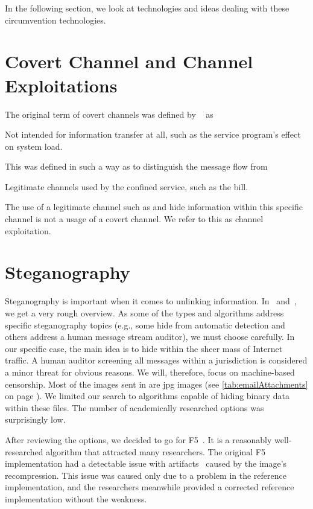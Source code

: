In the following section, we look at technologies and ideas dealing with these circumvention technologies.

\section{Covert Channel and Channel Exploitations}
The original term of covert channels was defined by \citeauthor{Lampson73anote}~\cite{Lampson73anote} as 

\begin{shadequote}{}
	Not intended for information transfer at all, such as the service program's effect on system load.
\end{shadequote}

This was defined  in such a way as to distinguish the message flow from 

\begin{shadequote}{}
	Legitimate channels used by the confined service, such as the bill.
\end{shadequote}

The use of a legitimate channel such as  and hide information within this specific channel is not a usage of a covert channel. We refer to this as channel exploitation.

\section{Steganography}
Steganography is important when it comes to unlinking information. In~\cite{6828087} and~\cite{subhedar2014current}, we get a very rough overview. As some of the types and algorithms address specific steganography topics (e.g., some hide from automatic detection and others address a human message stream auditor), we must choose carefully. In our specific case, the main idea is to hide within the sheer mass of Internet traffic. A human auditor screening all messages within a jurisdiction is considered a minor threat for obvious reasons. We will, therefore,  focus on machine-based censorship. Most of the images sent in  are jpg images (see \cref{tab:emailAttachments} on page \pageref{tab:emailAttachments}). We limited our search to algorithms capable of hiding binary data within these files. The number of academically researched options was surprisingly low.

After reviewing the options, we decided to go for F5~\cite{f5}. It is a reasonably well-researched algorithm that attracted many researchers. The original F5 implementation had a detectable issue with artifacts~\cite{F5broken} caused by the image's recompression. This issue was caused only due to a problem in the reference implementation, and the researchers meanwhile provided a corrected reference implementation without the weakness.

